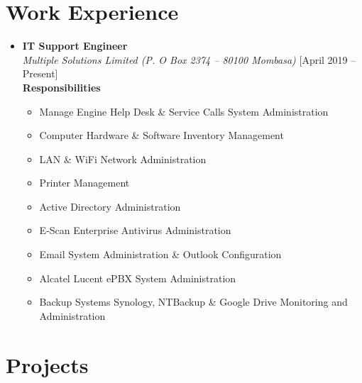 \documentclass[11pt,a4paper]{moderncv}
\begin{document}
\section{Work Experience}

\begin{itemize}
	
	\item \textbf{IT Support Engineer}\\
	\textit{Multiple Solutions Limited (P. O Box 2374 { -- } 80100 Mombasa)} \hfill [April 2019 { -- } Present]\\
	\textbf{Responsibilities}
	\begin{itemize}
		\item Manage Engine Help Desk \& Service Calls System Administration
		\item Computer Hardware \& Software Inventory Management
		\item LAN \& WiFi Network Administration 
		\item Printer Management
		\item Active Directory Administration
		\item E-Scan Enterprise Antivirus Administration
		\item Email System Administration \& Outlook Configuration
		\item Alcatel Lucent ePBX System Administration 
		\item Backup Systems Synology, NTBackup \& Google Drive Monitoring and Administration 
	\end{itemize}
	
\end{itemize}

\section{Projects}
\end{document}
